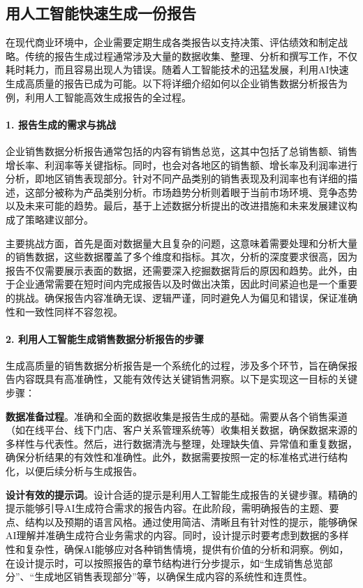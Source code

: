 \subsection{用人工智能快速生成一份报告}

在现代商业环境中，企业需要定期生成各类报告以支持决策、评估绩效和制定战略。传统的报告生成过程通常涉及大量的数据收集、整理、分析和撰写工作，不仅耗时耗力，而且容易出现人为错误。随着人工智能技术的迅猛发展，利用AI快速生成高质量的报告已成为可能。以下将详细介绍如何以企业销售数据分析报告为例，利用人工智能高效生成报告的全过程。

\paragraph{1. 报告生成的需求与挑战} 

企业销售数据分析报告通常包括的内容有销售总览，这其中包括了总销售额、销售增长率、利润率等关键指标。同时，也会对各地区的销售额、增长率及利润率进行分析，即地区销售表现部分。针对不同产品类别的销售表现及利润率也有详细的描述，这部分被称为产品类别分析。市场趋势分析则着眼于当前市场环境、竞争态势以及未来可能的趋势。最后，基于上述数据分析提出的改进措施和未来发展建议构成了策略建议部分。

主要挑战方面，首先是面对数据量大且复杂的问题，这意味着需要处理和分析大量的销售数据，这些数据覆盖了多个维度和指标。其次，分析的深度要求很高，因为报告不仅需要展示表面的数据，还需要深入挖掘数据背后的原因和趋势。此外，由于企业通常需要在短时间内完成报告以及时做出决策，因此时间紧迫也是一个重要的挑战。确保报告内容准确无误、逻辑严谨，同时避免人为偏见和错误，保证准确性和一致性同样不容忽视。

\paragraph{2. 利用人工智能生成销售数据分析报告的步骤} 

生成高质量的销售数据分析报告是一个系统化的过程，涉及多个环节，旨在确保报告内容既具有高准确性，又能有效传达关键销售洞察。以下是实现这一目标的关键步骤：

\textbf{数据准备过程}。准确和全面的数据收集是报告生成的基础。需要从各个销售渠道（如在线平台、线下门店、客户关系管理系统等）收集相关数据，确保数据来源的多样性与代表性。然后，进行数据清洗与整理，处理缺失值、异常值和重复数据，确保分析结果的有效性和准确性。此外，数据需要按照一定的标准格式进行结构化，以便后续分析与生成报告。

\textbf{设计有效的提示词}。设计合适的提示是利用人工智能生成报告的关键步骤。精确的提示能够引导AI生成符合需求的报告内容。在此阶段，需明确报告的主题、要点、结构以及预期的语言风格。通过使用简洁、清晰且有针对性的提示，能够确保AI理解并准确生成符合业务需求的内容。同时，设计提示时要考虑到数据的多样性和复杂性，确保AI能够应对各种销售情境，提供有价值的分析和洞察。例如，在设计提示时，可以按照报告的章节结构进行分步提示，如“生成销售总览部分”、“生成地区销售表现部分”等，以确保生成内容的系统性和连贯性。

